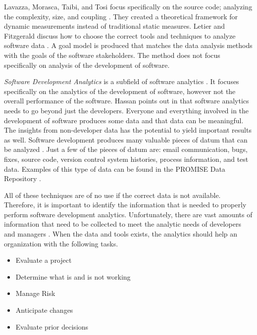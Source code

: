 \documentclass[SDSUThesis.tex]{subfiles}
\begin{document}
    Lavazza, Morasca, Taibi, and Tosi focus specifically 
    on the source code; analyzing the 
    complexity, size, and coupling \cite{Tosi2012}. 
    They created a theoretical framework
    for dynamic measurements instead of traditional static measures.
    Letier and Fitzgerald discuss how to choose the 
    correct tools and techniques to analyze
    software data \cite{Letier2013}.  A goal model is 
    produced that matches the data analysis methods
    with the goals of the software stakeholders. The method does not focus
    specifically on analysis of the development of software.
    
    \textit{Software Development Analytics} is a subfield of 
    software analytics \cite{Menzies2012}.  It focuses
    specifically on the 
    analytics of the development of software, however not
    the overall performance of the software.  Hassan points out
    in \cite{Hassan2013} that software analytics needs to go beyond
    just the developers.  Everyone and everything involved in the 
    development of software produces some data and that data can be meaningful.
    The insights from non-developer data has the potential to yield important
    results as well. 
    Software development produces many valuable pieces of datum that can be analyzed
    \cite{Marcus2010}. Just a few of the pieces of datum are:
    email communication, bugs, fixes, source code, version control system histories,
    process information, and test data.  Examples of this type of data
    can be found in the PROMISE Data Repository \cite{promise12}.
    
    All of these techniques are of no use if the correct data
    is not available.  Therefore, it is important to 
    identify the information that is needed to properly 
    perform software development analytics.
    Unfortunately, there are vast amounts of information that 
    need to be collected to meet the analytic needs of 
    developers and managers \cite{Buse2012}.  When the
    data and tools exists, the analytics should help an
    organization with the following tasks.
    \begin{itemize}
        \item Evaluate a project
        \item Determine what is and is not working
        \item Manage Risk
        \item Anticipate changes
        \item Evaluate prior decisions
    \end{itemize}
    
\end{document}
